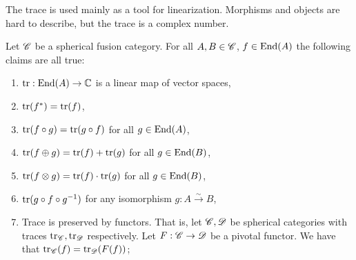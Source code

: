 The trace is used mainly as a tool for linearization. Morphisms and objects are hard to describe, but the trace is a complex number.

\begin{proposition}\label{trace} Let $\mathscr{C}$ be a spherical fusion category. For all $A,B\in \mathscr{C}$, $f\in \operatorname{End}(A)$ the following claims are all true:

\begin{enumerate}
\item $\operatorname{tr}: \operatorname{End}(A)\to \mathbb{C}$ is a linear map of vector spaces,
\item $\operatorname{tr}(f^{*})=\operatorname{tr}(f)$,
\item $\operatorname{tr}(f\circ g)=\operatorname{tr}(g\circ f)$ for all $g\in \operatorname{End}(A)$,
\item $\operatorname{tr}(f\oplus g)=\operatorname{tr}(f)+\operatorname{tr}(g)$ for all $g\in \operatorname{End}(B)$,
\item $\operatorname{tr}(f\otimes g)=\operatorname{tr}(f)\cdot \operatorname{tr}(g)$ for all $g\in \operatorname{End}(B)$,
\item $\operatorname{tr}(g\circ f\circ g^{-1})$ for any isomorphism $g:A\xrightarrow{\sim}B$,
\item Trace is preserved by functors. That is, let $\mathscr{C},\mathscr{D}$ be spherical categories with traces $\operatorname{tr}_{\mathscr{C}},\operatorname{tr}_{\mathscr{D}}$ respectively. Let $F:\mathscr{C}\to \mathscr{D}$ be a pivotal functor. We have that $\operatorname{tr}_{\mathscr{C}}(f)=\operatorname{tr}_{\mathscr{D}}(F(f))$;
\end{enumerate}

\end{proposition}
